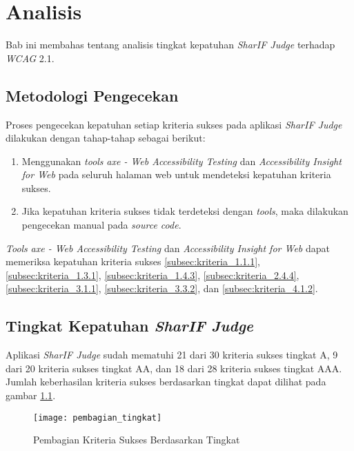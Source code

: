 \chapter{Analisis}
\label{chap:analisis}

Bab ini membahas tentang analisis tingkat kepatuhan \textit{SharIF Judge} terhadap \textit{WCAG} 2.1. 


\section{Metodologi Pengecekan}
\label{sec:metodologi_pengecekan}
Proses pengecekan kepatuhan setiap kriteria sukses pada aplikasi \textit{SharIF Judge} dilakukan 
dengan tahap-tahap sebagai berikut: 

\begin{enumerate}
	\item Menggunakan \textit{tools} \textit{axe - Web Accessibility Testing} dan \textit{Accessibility Insight for Web} pada seluruh halaman web untuk mendeteksi kepatuhan kriteria sukses.
	\item Jika kepatuhan kriteria sukses tidak terdeteksi dengan \textit{tools}, maka dilakukan pengecekan manual pada \textit{source code}.
\end{enumerate}

\textit{Tools} \textit{axe - Web Accessibility Testing} dan \textit{Accessibility Insight for Web} dapat memeriksa kepatuhan kriteria sukses \ref{subsec:kriteria_1.1.1}, \ref{subsec:kriteria_1.3.1}, \ref{subsec:kriteria_1.4.3}, \ref{subsec:kriteria_2.4.4}, \ref{subsec:kriteria_3.1.1}, \ref{subsec:kriteria_3.3.2}, dan \ref{subsec:kriteria_4.1.2}.

\section{Tingkat Kepatuhan \textit{SharIF Judge}}
\label{sec:kepatuhan_sharif_judge_terhadap_wcag_2.1}
Aplikasi \textit{SharIF Judge} sudah mematuhi 21 dari 30 kriteria sukses tingkat A, 9 dari 20 kriteria sukses tingkat AA, dan 18 dari 28 kriteria sukses tingkat AAA. Jumlah keberhasilan kriteria sukses berdasarkan tingkat dapat dilihat pada gambar \ref{fig:pembagian_kriteria_sukses_tingkat}.

\begin{figure}[H]
	\centering  
	\texttt{[image: pembagian\_tingkat]}  
	\caption[Pembagian Kriteria Sukses]{Pembagian Kriteria Sukses Berdasarkan Tingkat} 
	\label{fig:pembagian_kriteria_sukses_tingkat} 
\end{figure}

